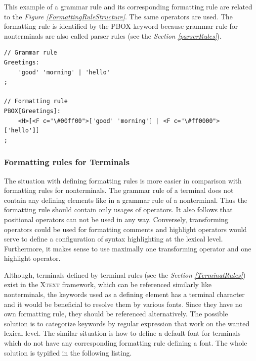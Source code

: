 \documentclass[12pt,notitlepage,a4paper]{report}
\begin{document}
\begin{expl}\label{GrammarRuleAndFormattingRule}
This example of a grammar rule and its corresponding formatting rule are related to the \textit{Figure \ref{FormattingRuleStructure}}. The same operators are used. The formatting rule is identified by the PBOX keyword because grammar rule for nonterminals are also called parser rules (see the \textit{Section \ref{parserRules}}). 
\begingroup
\fontsize{10pt}{12pt}
\begin{Verbatim}[commandchars=\\\{\}]
// Grammar rule
Greetings:
    'good' 'morning' | 'hello'
;

// Formatting rule
PBOX[Greetings]:
    <H>[<F c="\#00ff00">['good' 'morning'] | <F c="\#ff0000">['hello']]
;
\end{Verbatim}
\endgroup
\end{expl}

\subsubsection{Formatting rules for Terminals}

The situation with defining formatting rules is more easier in comparison with formatting rules for nonterminals. The grammar rule of a terminal does not contain any defining elements like in a grammar rule of a nonterminal. Thus the formatting rule should contain only usages of operators. It also follows that positional operators can not be used in any way. Conversely, transforming operators could be used for formatting comments and highlight operators would serve to define a configuration of syntax highlighting at the lexical level. Furthermore, it makes sense to use maximally one transforming operator and one highlight operator.

Although, terminals defined by terminal rules (see the \textit{Section \ref{TerminalRules}}) exist in the \textsc{Xtext} framework, which can be referenced similarly like nonterminals, the keywords used as a defining element has a terminal character and it would be beneficial to resolve them by various fonts. Since they have no own formatting rule, they should be referenced alternatively. The possible solution is to categorize keywords by regular expression that work on the wanted lexical level. The similar situation is how to define a default font for terminals which do not have any corresponding formatting rule defining a font. The whole solution is typified in the following listing.
\end{document}
